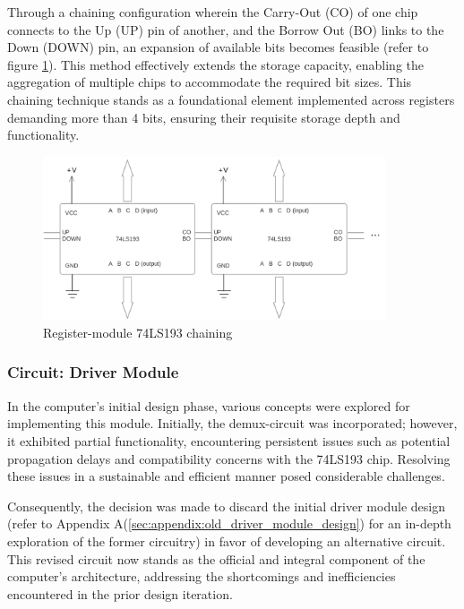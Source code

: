 Through a chaining configuration wherein the Carry-Out (CO) of one chip connects to the Up (UP) pin of another, and the Borrow Out (BO) links to the Down (DOWN) pin, an expansion of available bits becomes feasible (refer to figure \ref{fig:registerModuleChaining}). This method effectively extends the storage capacity, enabling the aggregation of multiple chips to accommodate the required bit sizes. This chaining technique stands as a foundational element implemented across registers demanding more than 4 bits, ensuring their requisite storage depth and functionality.

\begin{figure}[H]
	\centering
	\includegraphics[width=0.9\textwidth]{img/register_module_chaining}
	\caption{Register-module 74LS193 chaining}
	\label{fig:registerModuleChaining}
\end{figure}

\subsubsection{Circuit: Driver Module}

In the computer's initial design phase, various concepts were explored for implementing this module. Initially, the demux-circuit was incorporated; however, it exhibited partial functionality, encountering persistent issues such as potential propagation delays and compatibility concerns with the 74LS193 chip. Resolving these issues in a sustainable and efficient manner posed considerable challenges.

Consequently, the decision was made to discard the initial driver module design (refer to Appendix A(\ref{sec:appendix:old_driver_module_design}) for an in-depth exploration of the former circuitry) in favor of developing an alternative circuit. This revised circuit now stands as the official and integral component of the computer's architecture, addressing the shortcomings and inefficiencies encountered in the prior design iteration.

